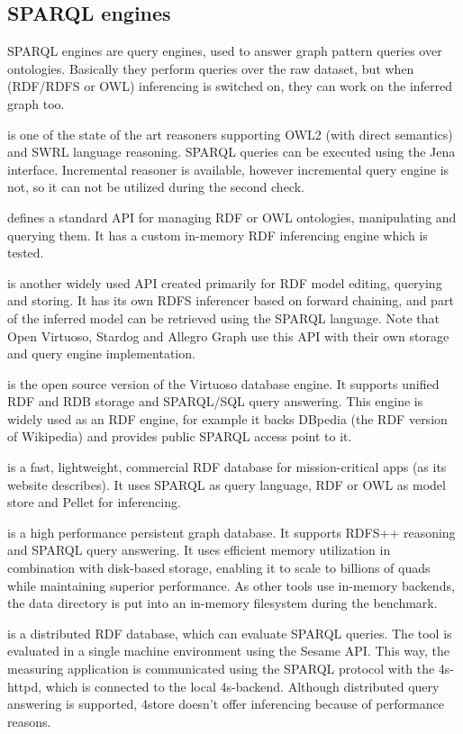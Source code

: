 \subsection{SPARQL engines}
SPARQL engines are query engines, used to answer graph pattern queries over
ontologies. Basically they perform queries over the raw dataset, but when
(RDF/RDFS or OWL) inferencing is switched on, they can work on the inferred
graph too.

 \cite{Pellet} is one of the state of the art reasoners
supporting OWL2 (with direct semantics) and SWRL language reasoning. SPARQL
queries can be executed using the Jena interface. Incremental reasoner is
available, however incremental query engine is not, so it can not be utilized
during the second check.

 \cite{Jena} defines a standard API for managing RDF or OWL
ontologies, manipulating and querying them. It has a custom in-memory RDF
inferencing engine which is tested.

 \cite{sesame} is another widely used API created primarily for
RDF model editing, querying and storing. It has its own RDFS inferencer based on
forward chaining, and part of the inferred model can be retrieved using the
SPARQL language. Note that Open Virtuoso, Stardog and Allegro Graph use this API
with their own storage and query engine implementation.

 \cite{openvirtuoso} is the open source version of the
Virtuoso database engine. It supports unified RDF and RDB storage and SPARQL/SQL
query answering. This engine is widely used as an RDF engine, for example it
backs DBpedia (the RDF version of Wikipedia) and provides public SPARQL access
point to it.

 \cite{stardog} is a fast, lightweight, commercial RDF database
for mission-critical apps (as its website describes). It uses SPARQL as query
language, RDF or OWL as model store and Pellet for inferencing.

 \cite{allegrograph} is a high performance persistent
graph database. It supports RDFS++ reasoning and SPARQL query answering. It uses
efficient memory utilization in combination with disk-based storage, enabling it
to scale to billions of quads while maintaining superior performance. As other
tools use in-memory backends, the data directory is put into an in-memory
filesystem during the benchmark.

 \cite{harris20094store} is a distributed RDF database, which
can evaluate SPARQL queries. The tool is evaluated in a single machine
environment using the Sesame API. This way, the measuring application is
communicated using the SPARQL protocol with the 4s-httpd, which is connected to
the local 4s-backend. Although distributed query answering is supported, 4store
doesn't offer inferencing because of performance reasons.

